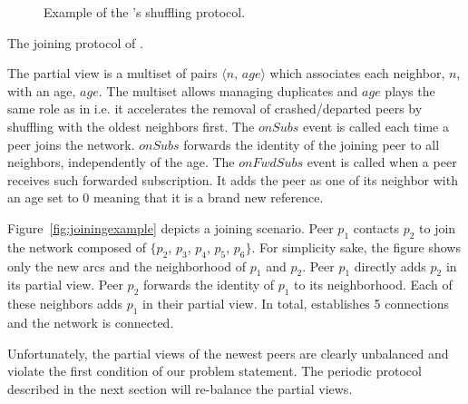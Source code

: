 \begin{figure*}
  \centering
  \hspace{10pt}
  \hspace{10pt}
  \caption{\label{fig:cyclicexample}Example of the \SPRAY's shuffling
    protocol. }
\end{figure*}

\begin{algorithm}[h]

\caption{\label{algo:joining}The joining protocol of \SPRAY.}
\end{algorithm}

The partial view is a multiset of pairs $\langle n,\, age\rangle$ which
associates each neighbor, $n$, with an age, $age$. The multiset allows managing
duplicates and $age$ plays the same role as in \CYCLON i.e.  it accelerates
the removal of crashed/departed peers by shuffling with the oldest neighbors
first. The $onSubs$ event is called each time a peer joins the
network. $onSubs$ forwards the identity of the joining peer to all neighbors,
independently of the age. The $onFwdSubs$ event is called when a peer receives
such forwarded subscription. It adds the peer as one of its neighbor with an
age set to $0$ meaning that it is a brand new reference.

Figure~\ref{fig:joiningexample} depicts a joining scenario.
Peer $p_1$ contacts $p_2$ to join the network composed of $\{p_2$, $p_3$,
$p_4$, $p_5$, $p_6\}$. For simplicity sake, the figure shows only the new arcs
and the neighborhood of $p_1$ and $p_2$. Peer $p_1$ directly adds $p_2$ in its
partial view. Peer $p_2$ forwards the identity of $p_1$ to its
neighborhood. Each of these neighbors adds $p_1$ in their partial view. In
total, \SPRAY establishes 5 connections and the network is connected.

Unfortunately, the partial views of the newest peers are clearly unbalanced and
violate the first condition of our problem statement. The periodic protocol
described in the next section will re-balance the partial views.

